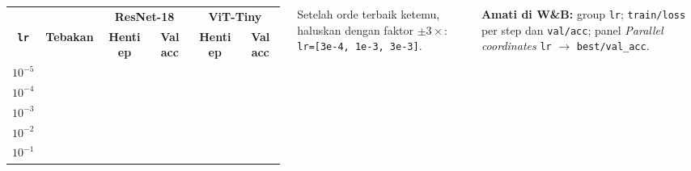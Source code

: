 \documentclass[t,aspectratio=169,xcolor={dvipsnames,table}]{beamer}
\begin{document}
\begin{frame}
\begin{columns}[T]
        \vspace{2pt}
        \scriptsize
        \setlength{\tabcolsep}{4pt}
        \renewcommand{\arraystretch}{1.5}
        \begin{tabular}{|c|c|c|c|c|c|}
            \rowcolor{dlSoftCloud} & & \multicolumn{2}{c|}{\textbf{ResNet-18}} & \multicolumn{2}{c|}{\textbf{ViT-Tiny}} \\
            \rowcolor{dlSoftCloud} \textbf{\texttt{lr}} & \textbf{Tebakan} & \textbf{Henti ep} & \textbf{Val acc} & \textbf{Henti ep} & \textbf{Val acc} \\ \hline
            $10^{-5}$ & \hspace{0.75cm} & \hspace{0.75cm} & \hspace{0.75cm} & \hspace{0.75cm} & \hspace{0.75cm} \\ \hline
            $10^{-4}$ & \hspace{0.75cm} & \hspace{0.75cm} & \hspace{0.75cm} & \hspace{0.75cm} & \hspace{0.75cm} \\ \hline
            $10^{-3}$ & \hspace{0.75cm} & \hspace{0.75cm} & \hspace{0.75cm} & \hspace{0.75cm} & \hspace{0.75cm} \\ \hline
            $10^{-2}$ & \hspace{0.75cm} & \hspace{0.75cm} & \hspace{0.75cm} & \hspace{0.75cm} & \hspace{0.75cm} \\ \hline
            $10^{-1}$ & \hspace{0.75cm} & \hspace{0.75cm} & \hspace{0.75cm} & \hspace{0.75cm} & \hspace{0.75cm} \\ \hline
        \end{tabular}

        \vspace{0.12cm}
        {\scriptsize Setelah orde terbaik ketemu, haluskan dengan faktor $\pm3\times$: \texttt{lr=[3e-4, 1e-3, 3e-3]}.}

        \vspace{0.1cm}
        {\scriptsize\color{dlMute} \textbf{Amati di W\&B:} group \texttt{lr}; \texttt{train/loss} per step dan \texttt{val/acc}; panel \emph{Parallel coordinates} \texttt{lr} $\to$ \texttt{best/val\_acc}.}
    \end{columns}
\end{frame}
\end{document}
